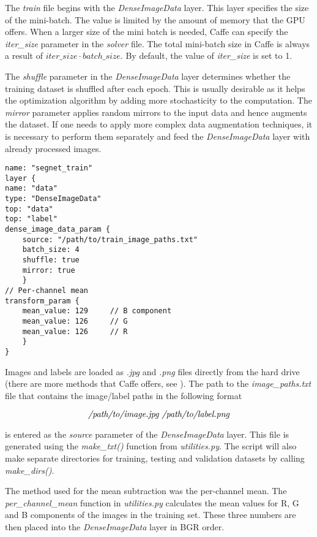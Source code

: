 The \textit{train} file begins with the \textit{DenseImageData} layer. This layer specifies the size of the mini-batch. The value is limited by the amount of memory that the GPU offers. When a larger size of the mini batch is needed, Caffe can specify the \textit{iter\_size} parameter in the \textit{solver} file. The total mini-batch size in Caffe is always a result of $iter\_size \cdot batch\_size$. By default, the value of \textit{iter\_size} is set to 1. \cite{caffe}

The \textit{shuffle} parameter in the \textit{DenseImageData} layer determines whether the training dataset is shuffled after each epoch. This is usually desirable as it helps the optimization algorithm by adding more stochasticity to the computation. The \textit{mirror} parameter applies random mirrors to the input data and hence augments the dataset. If one needs to apply more complex data augmentation techniques, it is necessary to perform them separately and feed the \textit{DenseImageData} layer with already processed images. \cite{caffe}

\begin{lstlisting}[caption={Input layer in \textit{train.prototxt} \cite{filip_github}},captionpos=b]
name: "segnet_train"
layer {
name: "data"
type: "DenseImageData"
top: "data"
top: "label"
dense_image_data_param {
	source: "/path/to/train_image_paths.txt"
	batch_size: 4   			    			
	shuffle: true
	mirror: true	
	}
// Per-channel mean
transform_param {
	mean_value: 129		// B component
	mean_value: 126		// G
	mean_value: 126		// R
	}
}
\end{lstlisting} 

Images and labels are loaded as \textit{.jpg} and \textit{.png} files directly from the hard drive (there are more methods that Caffe offers, see \cite{caffe}). The path to the \textit{image\_paths.txt} file that contains the image/label paths in the following format

$$
\text{\textit{/path/to/image.jpg /path/to/label.png}}
$$

\noindent is entered as the \textit{source} parameter of the \textit{DenseImageData} layer. This file is generated using the \textit{make\_txt()} function from \textit{utilities.py}. The script will also make separate directories for training, testing and validation datasets by calling \textit{make\_dirs()}.

The method used for the mean subtraction was the per-channel mean. The \textit{per\_channel\_mean} function in \textit{utilities.py} calculates the mean values for R, G and B components of the images in the training set. These three numbers are then placed into the \textit{DenseImageData} layer in BGR order.

